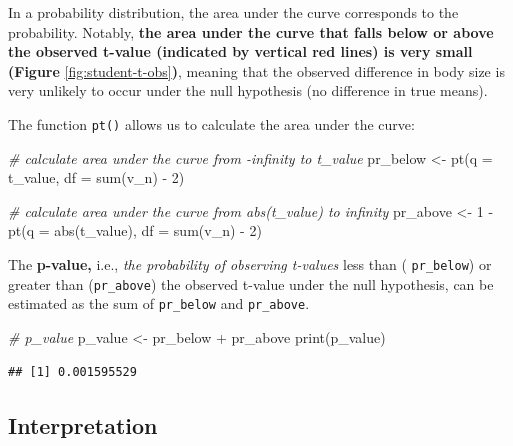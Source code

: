 \documentclass[
]{book}
\newenvironment{Shaded}{\begin{snugshade}}{\end{snugshade}}
\newcommand{\AttributeTok}[1]{\textcolor[rgb]{0.77,0.63,0.00}{#1}}
\newcommand{\CommentTok}[1]{\textcolor[rgb]{0.56,0.35,0.01}{\textit{#1}}}
\newcommand{\DecValTok}[1]{\textcolor[rgb]{0.00,0.00,0.81}{#1}}
\newcommand{\FunctionTok}[1]{\textcolor[rgb]{0.00,0.00,0.00}{#1}}
\newcommand{\NormalTok}[1]{#1}
\newcommand{\OtherTok}[1]{\textcolor[rgb]{0.56,0.35,0.01}{#1}}
\newcommand{\SpecialCharTok}[1]{\textcolor[rgb]{0.00,0.00,0.00}{#1}}
\begin{document}
In a probability distribution, the area under the curve corresponds to the probability. Notably, \textbf{the area under the curve that falls below or above the observed t-value (indicated by vertical red lines) is very small (Figure} \ref{fig:student-t-obs}\textbf{)}, meaning that the observed difference in body size is very unlikely to occur under the null hypothesis (no difference in true means).

The function \texttt{pt()} allows us to calculate the area under the curve:

\begin{Shaded}
\begin{Highlighting}[]
\CommentTok{\# calculate area under the curve from {-}infinity to t\_value}
\NormalTok{pr\_below }\OtherTok{\textless{}{-}} \FunctionTok{pt}\NormalTok{(}\AttributeTok{q =}\NormalTok{ t\_value, }\AttributeTok{df =} \FunctionTok{sum}\NormalTok{(v\_n) }\SpecialCharTok{{-}} \DecValTok{2}\NormalTok{)}

\CommentTok{\# calculate area under the curve from abs(t\_value) to infinity}
\NormalTok{pr\_above }\OtherTok{\textless{}{-}} \DecValTok{1} \SpecialCharTok{{-}} \FunctionTok{pt}\NormalTok{(}\AttributeTok{q =} \FunctionTok{abs}\NormalTok{(t\_value), }\AttributeTok{df =} \FunctionTok{sum}\NormalTok{(v\_n) }\SpecialCharTok{{-}} \DecValTok{2}\NormalTok{)}
\end{Highlighting}
\end{Shaded}

The \textbf{p-value,} i.e., \emph{the probability of observing t-values} less than ( \texttt{pr\_below}) or greater than (\texttt{pr\_above}) the observed t-value under the null hypothesis, can be estimated as the sum of \texttt{pr\_below} and \texttt{pr\_above}.

\begin{Shaded}
\begin{Highlighting}[]
\CommentTok{\# p\_value}
\NormalTok{p\_value }\OtherTok{\textless{}{-}}\NormalTok{ pr\_below }\SpecialCharTok{+}\NormalTok{ pr\_above}
\FunctionTok{print}\NormalTok{(p\_value)}
\end{Highlighting}
\end{Shaded}

\begin{verbatim}
## [1] 0.001595529
\end{verbatim}

\hypertarget{interpretation}{%
\subsection{Interpretation}\label{interpretation}}
\end{document}
